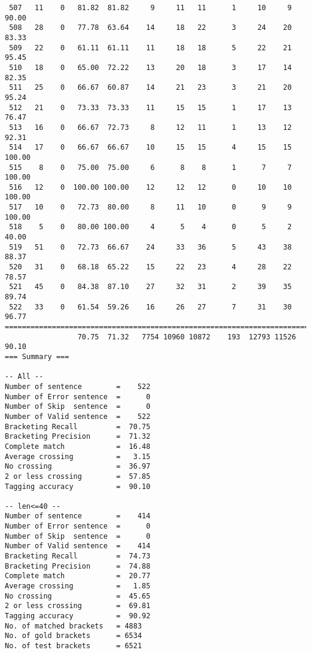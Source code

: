 \begin{verbatim}
 507   11    0   81.82  81.82     9     11   11      1     10     9    90.00
 508   28    0   77.78  63.64    14     18   22      3     24    20    83.33
 509   22    0   61.11  61.11    11     18   18      5     22    21    95.45
 510   18    0   65.00  72.22    13     20   18      3     17    14    82.35
 511   25    0   66.67  60.87    14     21   23      3     21    20    95.24
 512   21    0   73.33  73.33    11     15   15      1     17    13    76.47
 513   16    0   66.67  72.73     8     12   11      1     13    12    92.31
 514   17    0   66.67  66.67    10     15   15      4     15    15   100.00
 515    8    0   75.00  75.00     6      8    8      1      7     7   100.00
 516   12    0  100.00 100.00    12     12   12      0     10    10   100.00
 517   10    0   72.73  80.00     8     11   10      0      9     9   100.00
 518    5    0   80.00 100.00     4      5    4      0      5     2    40.00
 519   51    0   72.73  66.67    24     33   36      5     43    38    88.37
 520   31    0   68.18  65.22    15     22   23      4     28    22    78.57
 521   45    0   84.38  87.10    27     32   31      2     39    35    89.74
 522   33    0   61.54  59.26    16     26   27      7     31    30    96.77
============================================================================
                 70.75  71.32   7754 10960 10872    193  12793 11526    90.10
=== Summary ===

-- All --
Number of sentence        =    522
Number of Error sentence  =      0
Number of Skip  sentence  =      0
Number of Valid sentence  =    522
Bracketing Recall         =  70.75
Bracketing Precision      =  71.32
Complete match            =  16.48
Average crossing          =   3.15
No crossing               =  36.97
2 or less crossing        =  57.85
Tagging accuracy          =  90.10

-- len<=40 --
Number of sentence        =    414
Number of Error sentence  =      0
Number of Skip  sentence  =      0
Number of Valid sentence  =    414
Bracketing Recall         =  74.73
Bracketing Precision      =  74.88
Complete match            =  20.77
Average crossing          =   1.85
No crossing               =  45.65
2 or less crossing        =  69.81
Tagging accuracy          =  90.92
No. of matched brackets   = 4883
No. of gold brackets      = 6534
No. of test brackets      = 6521

\end{verbatim}

\normalsize

